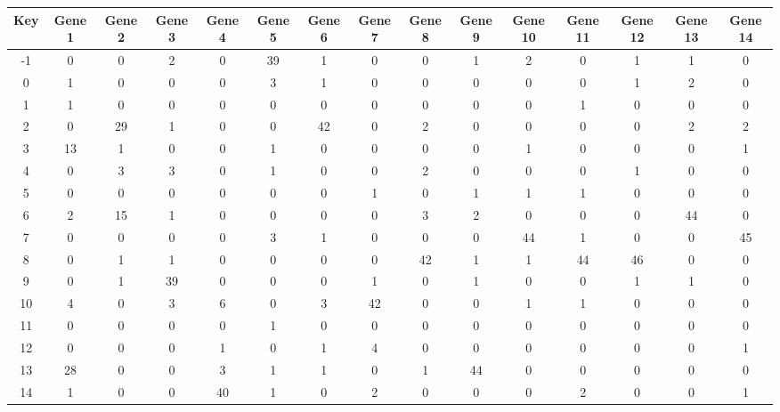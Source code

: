 \begin{tabular}{|c|c|c|c|c|c|c|c|c|c|c|c|c|c|c|}
\hline
Key & Gene 1 & Gene 2 & Gene 3 & Gene 4 & Gene 5 & Gene 6 & Gene 7 & Gene 8 & Gene 9 & Gene 10 & Gene 11 & Gene 12 & Gene 13 & Gene 14 \\
\hline
-1 & 0 & 0 & 2 & 0 & 39 & 1 & 0 & 0 & 1 & 2 & 0 & 1 & 1 & 0 \\
0 & 1 & 0 & 0 & 0 & 3 & 1 & 0 & 0 & 0 & 0 & 0 & 1 & 2 & 0 \\
1 & 1 & 0 & 0 & 0 & 0 & 0 & 0 & 0 & 0 & 0 & 1 & 0 & 0 & 0 \\
2 & 0 & 29 & 1 & 0 & 0 & 42 & 0 & 2 & 0 & 0 & 0 & 0 & 2 & 2 \\
3 & 13 & 1 & 0 & 0 & 1 & 0 & 0 & 0 & 0 & 1 & 0 & 0 & 0 & 1 \\
4 & 0 & 3 & 3 & 0 & 1 & 0 & 0 & 2 & 0 & 0 & 0 & 1 & 0 & 0 \\
5 & 0 & 0 & 0 & 0 & 0 & 0 & 1 & 0 & 1 & 1 & 1 & 0 & 0 & 0 \\
6 & 2 & 15 & 1 & 0 & 0 & 0 & 0 & 3 & 2 & 0 & 0 & 0 & 44 & 0 \\
7 & 0 & 0 & 0 & 0 & 3 & 1 & 0 & 0 & 0 & 44 & 1 & 0 & 0 & 45 \\
8 & 0 & 1 & 1 & 0 & 0 & 0 & 0 & 42 & 1 & 1 & 44 & 46 & 0 & 0 \\
9 & 0 & 1 & 39 & 0 & 0 & 0 & 1 & 0 & 1 & 0 & 0 & 1 & 1 & 0 \\
10 & 4 & 0 & 3 & 6 & 0 & 3 & 42 & 0 & 0 & 1 & 1 & 0 & 0 & 0 \\
11 & 0 & 0 & 0 & 0 & 1 & 0 & 0 & 0 & 0 & 0 & 0 & 0 & 0 & 0 \\
12 & 0 & 0 & 0 & 1 & 0 & 1 & 4 & 0 & 0 & 0 & 0 & 0 & 0 & 1 \\
13 & 28 & 0 & 0 & 3 & 1 & 1 & 0 & 1 & 44 & 0 & 0 & 0 & 0 & 0 \\
14 & 1 & 0 & 0 & 40 & 1 & 0 & 2 & 0 & 0 & 0 & 2 & 0 & 0 & 1 \\
\hline
\end{tabular}